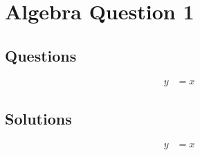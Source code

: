 \chapter{Algebra Question 1}
\label{chap:aq1}

\section{Questions}
\label{sec:aq1q}
\begin{align}
  y &= x
\end{align}

\section{Solutions}
\label{sec:aq1s}
\begin{align}
  y &= x
\end{align}